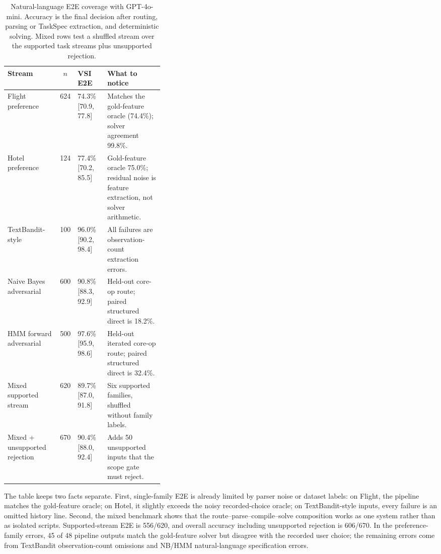 \documentclass{article}
\newcommand{\taskspec}{TaskSpec}
\begin{document}
\begin{table}[t]
\centering
\small
\caption{Natural-language E2E coverage with GPT-4o-mini. Accuracy is the final decision after routing, parsing or \taskspec{} extraction, and deterministic solving. Mixed rows test a shuffled stream over the supported task streams plus unsupported rejection.}
\label{tab:e2e_coverage}
\begin{tabular}{@{}lclp{0.36\linewidth}@{}}
\toprule
Stream & $n$ & VSI E2E & What to notice \\
\midrule
Flight preference & 624 & 74.3\% {\scriptsize [70.9, 77.8]} & Matches the gold-feature oracle (74.4\%); solver agreement 99.8\%. \\
Hotel preference & 124 & 77.4\% {\scriptsize [70.2, 85.5]} & Gold-feature oracle 75.0\%; residual noise is feature extraction, not solver arithmetic. \\
TextBandit-style & 100 & 96.0\% {\scriptsize [90.2, 98.4]} & All failures are observation-count extraction errors. \\
Naive Bayes adversarial & 600 & 90.8\% {\scriptsize [88.3, 92.9]} & Held-out core-op route; paired structured direct is 18.2\%. \\
HMM forward adversarial & 500 & 97.6\% {\scriptsize [95.9, 98.6]} & Held-out iterated core-op route; paired structured direct is 32.4\%. \\
\midrule
Mixed supported stream & 620 & 89.7\% {\scriptsize [87.0, 91.8]} & Six supported families, shuffled without family labels. \\
Mixed + unsupported rejection & 670 & 90.4\% {\scriptsize [88.0, 92.4]} & Adds 50 unsupported inputs that the scope gate must reject. \\
\bottomrule
\end{tabular}
\end{table}

The table keeps two facts separate.
First, single-family E2E is already limited by parser noise or dataset labels: on Flight, the pipeline matches the gold-feature oracle; on Hotel, it slightly exceeds the noisy recorded-choice oracle; on TextBandit-style inputs, every failure is an omitted history line.
Second, the mixed benchmark shows that the route--parse--compile--solve composition works as one system rather than as isolated scripts.
Supported-stream E2E is 556/620, and overall accuracy including unsupported rejection is 606/670.
In the preference-family errors, 45 of 48 pipeline outputs match the gold-feature solver but disagree with the recorded user choice; the remaining errors come from TextBandit observation-count omissions and NB/HMM natural-language specification errors.
\end{document}

